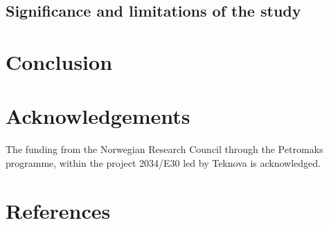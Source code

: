 \documentclass[final,times,5p]{elsarticle}
\begin{document}
	
	\subsection{Significance and limitations of the study}


\section{Conclusion}
\label{sec:conclusion}
			

\section*{Acknowledgements}
The funding from the Norwegian Research Council through the Petromaks programme, within the project 2034/E30 led by Teknova is acknowledged. 


\appendix



\section*{References}
\label{References}



			
\end{document}
